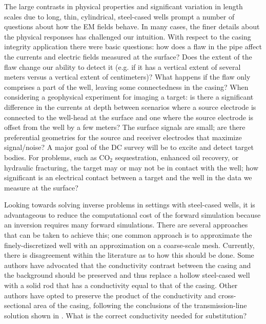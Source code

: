 The large contrasts in physical properties and significant variation in length scales due to long, thin, cylindrical, steel-cased wells prompt a number of questions about how the EM fields behave. In many cases, the finer details about the physical responses has challenged our intuition. With respect to the casing integrity application there were basic questions: how does a flaw in the pipe affect the currents and electric fields measured at the surface? Does the extent of the flaw change our ability to detect it (e.g. if it has a vertical extent of several meters versus a vertical extent of centimeters)? What happens if the flaw only comprises a part of the well, leaving some connectedness in the casing? When considering a geophysical experiment for imaging a target:  is there a significant difference in the currents at depth between scenarios where a source electrode is connected to the well-head at the surface and one where the source electrode is offset from the well by a few meters? The surface signals are small; are there preferential geometries for the source and receiver electrodes that maximize signal/noise? A major goal of the DC survey will be to excite and detect target bodies. For problems, such as CO$_2$ sequestration, enhanced oil recovery, or hydraulic fracturing, the target may or may not be in contact with the well; how significant is an electrical contact between a target and the well in the data we measure at the surface?

Looking towards solving inverse problems in settings with steel-cased wells, it is advantageous to reduce the computational cost of the forward simulation because an inversion requires many forward simulations. There are several approaches that can be taken to achieve this; one common approach is to approximate the finely-discretized well with an approximation on a coarse-scale mesh. Currently, there is disagreement within the literature as to how this should be done. Some authors have advocated that the conductivity contrast between the casing and the background should be preserved and thus replace a hollow steel-cased well with a solid rod that has a conductivity equal to that of the casing. Other authors have opted to preserve the product of the conductivity and cross-sectional area of the casing, following the conclusions of the transmission-line solution shown in \cite{Kaufman1990}. What is the correct conductivity needed for substitution?

